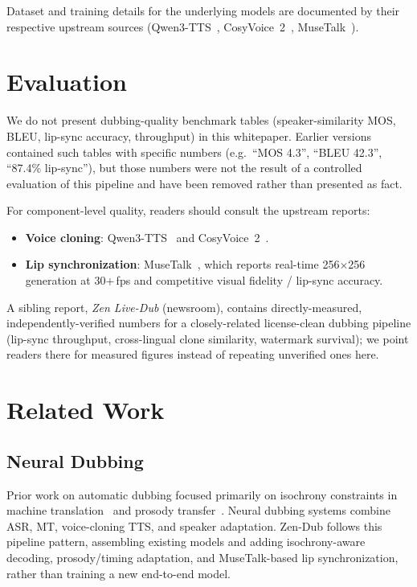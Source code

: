 \documentclass[11pt,a4paper]{article}
\begin{document}
Dataset and training details for the underlying models are documented by their
respective upstream sources (Qwen3-TTS~\cite{qwen3tts}, CosyVoice~2~\cite{cosyvoice2},
MuseTalk~\cite{musetalk}).

\section{Evaluation}
\label{sec:eval}

We do not present dubbing-quality benchmark tables (speaker-similarity MOS, BLEU,
lip-sync accuracy, throughput) in this whitepaper. Earlier versions contained such
tables with specific numbers (e.g.\ ``MOS 4.3'', ``BLEU 42.3'', ``87.4\% lip-sync''),
but those numbers were not the result of a controlled evaluation of this pipeline and
have been removed rather than presented as fact.

For component-level quality, readers should consult the upstream reports:
\begin{itemize}
\item \textbf{Voice cloning}: Qwen3-TTS~\cite{qwen3tts} and CosyVoice~2~\cite{cosyvoice2}.
\item \textbf{Lip synchronization}: MuseTalk~\cite{musetalk}, which reports real-time
      256$\times$256 generation at 30+\,fps and competitive visual fidelity / lip-sync
      accuracy.
\end{itemize}

A sibling report, \emph{Zen Live-Dub} (newsroom), contains directly-measured,
independently-verified numbers for a closely-related license-clean dubbing pipeline
(lip-sync throughput, cross-lingual clone similarity, watermark survival); we point
readers there for measured figures instead of repeating unverified ones here.

\section{Related Work}
\label{sec:related}

\subsection{Neural Dubbing}

Prior work on automatic dubbing focused primarily on isochrony constraints in
machine translation~\cite{zetterholm2004} and prosody transfer~\cite{Federico2020}.
Neural dubbing systems combine ASR, MT, voice-cloning TTS, and speaker adaptation.
Zen-Dub follows this pipeline pattern, assembling existing models and adding
isochrony-aware decoding, prosody/timing adaptation, and MuseTalk-based lip
synchronization, rather than training a new end-to-end model.
\end{document}

